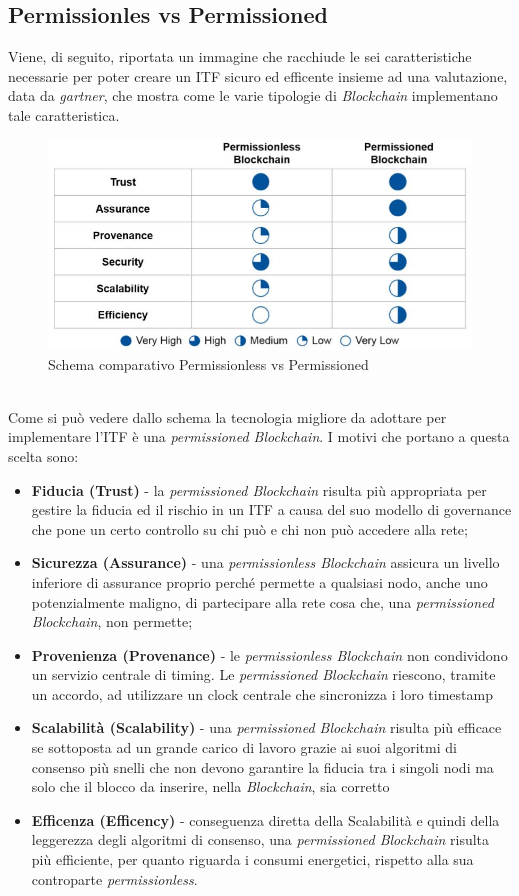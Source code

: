 \subsection{Permissionles vs Permissioned}
Viene, di seguito, riportata un immagine che racchiude le sei caratteristiche necessarie per poter creare un \gls{ITF} sicuro ed efficente insieme ad una valutazione, data da \emph{\gls{gartner}}\glsfirstoccur, che mostra come le varie tipologie di \textit{Blockchain} implementano tale caratteristica.
\begin{figure}[h]
	\centering
	\includegraphics[scale=0.50]{immagini/blockchain_ability_to_implement_ITF}
	\caption{Schema comparativo Permissionless vs Permissioned}
\end{figure} 
\\
Come si può vedere dallo schema la tecnologia migliore da adottare per implementare l'\gls{ITF} è una \textit{permissioned Blockchain}.
I motivi che portano a questa scelta sono:
\begin{itemize}
	\item \textbf{Fiducia (Trust)} - la \textit{permissioned Blockchain} risulta più appropriata per gestire la fiducia ed il rischio in un \gls{ITF} a causa del suo modello di governance che pone un certo controllo su chi può e chi non può accedere alla rete; 
	\item \textbf{Sicurezza (Assurance)} - una \textit{permissionless Blockchain} assicura un livello inferiore di assurance proprio perché permette a qualsiasi nodo, anche uno potenzialmente maligno, di partecipare alla rete cosa che, una \textit{permissioned Blockchain}, non permette;
	\item \textbf{Provenienza (Provenance)} - le \textit{permissionless Blockchain} non condividono un servizio centrale di timing. Le \textit{permissioned Blockchain} riescono, tramite un accordo, ad utilizzare un clock centrale che sincronizza i loro timestamp
	\item \textbf{Scalabilità (Scalability)} - una \textit{permissioned Blockchain} risulta più efficace se sottoposta ad un grande carico di lavoro grazie ai suoi algoritmi di consenso più snelli che non devono garantire la fiducia tra i singoli nodi ma solo che il blocco da inserire, nella \textit{Blockchain}, sia corretto 
	\item \textbf{Efficenza (Efficency)} - conseguenza diretta della Scalabilità e quindi della leggerezza degli algoritmi di consenso, una \textit{permissioned Blockchain} risulta più efficiente, per quanto riguarda i consumi energetici, rispetto alla sua controparte \textit{permissionless}.
\end{itemize}
